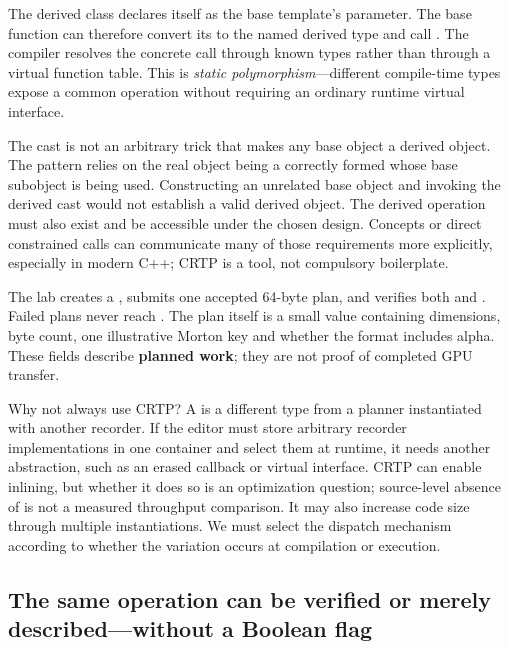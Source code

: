 The derived class declares itself as the base template's parameter. The base function can therefore convert its  to the named derived type and call . The compiler resolves the concrete call through known types rather than through a virtual function table. This is \emph{static polymorphism}---different compile-time types expose a common operation without requiring an ordinary runtime virtual interface.

The cast is not an arbitrary trick that makes any base object a derived object. The pattern relies on the real object being a correctly formed  whose  base subobject is being used. Constructing an unrelated base object and invoking the derived cast would not establish a valid derived object. The derived operation must also exist and be accessible under the chosen design. Concepts or direct constrained calls can communicate many of those requirements more explicitly, especially in modern C++; CRTP is a tool, not compulsory boilerplate.

The lab creates a , submits one accepted 64-byte plan, and verifies both  and . Failed plans never reach . The plan itself is a small value containing dimensions, byte count, one illustrative Morton key and whether the format includes alpha. These fields describe \textbf{planned work}; they are not proof of completed GPU transfer.

Why not always use CRTP? A  is a different type from a planner instantiated with another recorder. If the editor must store arbitrary recorder implementations in one container and select them at runtime, it needs another abstraction, such as an erased callback or virtual interface. CRTP can enable inlining, but whether it does so is an optimization question; source-level absence of  is not a measured throughput comparison. It may also increase code size through multiple instantiations. We must select the dispatch mechanism according to whether the variation occurs at compilation or execution.

\subsection{The same operation can be verified or merely described---without a Boolean flag}\label{05-engine-i-ch005-the-same-operation-can-be-verified-or-merely-describedwithout-a-boolean-flag}

